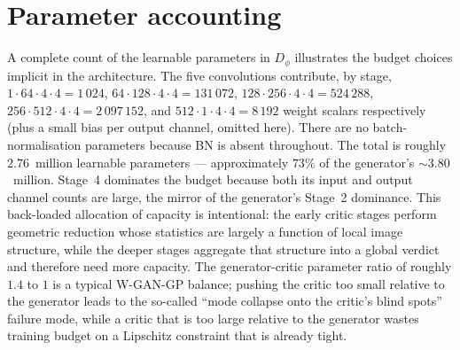 \section*{Parameter accounting}

A complete count of the learnable parameters in $D_\phi$ illustrates
the budget choices implicit in the architecture. The five convolutions
contribute, by stage,
$1 \cdot 64 \cdot 4 \cdot 4 = 1\,024$,
$64 \cdot 128 \cdot 4 \cdot 4 = 131\,072$,
$128 \cdot 256 \cdot 4 \cdot 4 = 524\,288$,
$256 \cdot 512 \cdot 4 \cdot 4 = 2\,097\,152$, and
$512 \cdot 1 \cdot 4 \cdot 4 = 8\,192$ weight scalars respectively
(plus a small bias per output channel, omitted here). There are no
batch-normalisation parameters because BN is absent throughout. The
total is roughly $2.76$~million learnable parameters --- approximately
$73\%$ of the generator's $\sim 3.80$~million. Stage~4 dominates the
budget because both its input and output channel counts are large, the
mirror of the generator's Stage~2 dominance. This back-loaded
allocation of capacity is intentional: the early critic stages perform
geometric reduction whose statistics are largely a function of local
image structure, while the deeper stages aggregate that structure into
a global verdict and therefore need more capacity. The
generator-critic parameter ratio of roughly $1.4$ to $1$ is a typical
W-GAN-GP balance; pushing the critic too small relative to the
generator leads to the so-called ``mode collapse onto the critic's
blind spots'' failure mode, while a critic that is too large relative
to the generator wastes training budget on a Lipschitz constraint that
is already tight.
